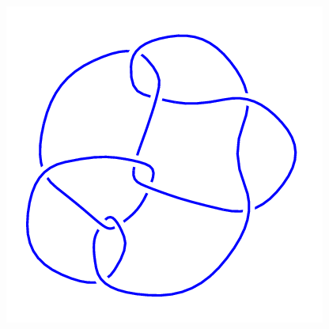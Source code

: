 \begin{figure}[H]
\begin{minipage}[b]{.18\linewidth}
	\end{minipage}
	\begin{minipage}[b]{.18\linewidth}
		\centering
		\includegraphics[width=\linewidth]{../data/10_136.png}
	\end{minipage}
\end{figure}

